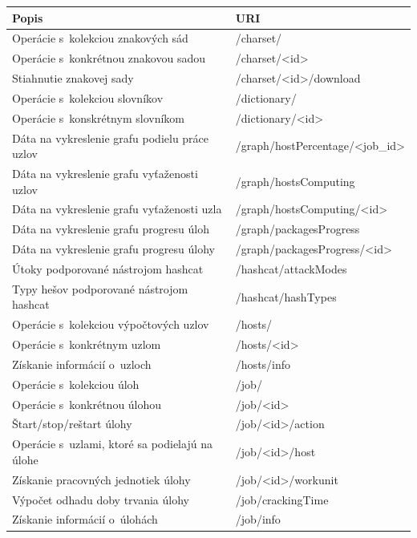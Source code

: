 \documentclass[slovak]{fitthesis}
\begin{document}
\begin{table}[h]
  \begin{center}
        \begin{tabular}{ |p{8cm}|p{7.4cm}|  }
         \hline
         Popis& URI\\
         \hline
          Operácie s~kolekciou znakových sád & /charset/ \\
          Operácie s~konkrétnou znakovou sadou & /charset/<id> \\
          Stiahnutie znakovej sady & /charset/<id>/download \\
          Operácie s~kolekciou slovníkov & /dictionary/ \\
          Operácie s~konskrétnym slovníkom & /dictionary/<id> \\
          Dáta na vykreslenie grafu podielu práce uzlov & /graph/hostPercentage/<job\_id> \\
          Dáta na vykreslenie grafu vyťaženosti uzlov & /graph/hostsComputing \\
          Dáta na vykreslenie grafu vyťaženosti uzla & /graph/hostsComputing/<id> \\
          Dáta na vykreslenie grafu progresu úloh & /graph/packagesProgress \\
          Dáta na vykreslenie grafu progresu úlohy & /graph/packagesProgress/<id> \\
          Útoky podporované nástrojom hashcat & /hashcat/attackModes \\
          Typy hešov podporované nástrojom hashcat & /hashcat/hashTypes \\
          Operácie s~kolekciou výpočtových uzlov & /hosts/ \\
          Operácie s~konkrétnym uzlom & /hosts/<id> \\
          Získanie informácií o~uzloch & /hosts/info \\
          Operácie s~kolekciou úloh & /job/ \\
          Operácie s~konkrétnou úlohou & /job/<id> \\
          Štart/stop/reštart úlohy & /job/<id>/action \\
          Operácie s~uzlami, ktoré sa podielajú na úlohe & /job/<id>/host \\
          Získanie pracovných jednotiek úlohy & /job/<id>/workunit \\
          Výpočet odhadu doby trvania úlohy & /job/crackingTime \\
          Získanie informácií o~úlohách & /job/info \\

\end{tabular}
\end{center}
\end{table}
\end{document}
